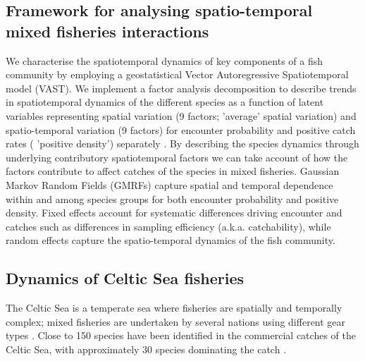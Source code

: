 \documentclass{nature}
\begin{document}
\begin{linenumbers}
\subsection{Framework for analysing spatio-temporal mixed fisheries
	interactions}

 We  characterise
the spatiotemporal dynamics of key components of a fish community by employing
a geostatistical Vector Autoregressive Spatiotemporal model (VAST). We
implement a factor analysis decomposition to describe trends in spatiotemporal
dynamics of the different species as a function of latent variables
\cite{Thorson2015} representing spatial variation (9 factors;  'average' spatial variation) and spatio-temporal variation (9
factors) for encounter probability and positive catch rates ( 'positive density') separately \cite{Thorson2015a}. By
describing the species dynamics through underlying contributory
spatiotemporal factors we can take account of how the factors contribute to
affect catches of the species in mixed fisheries.  Gaussian
Markov Random Fields (GMRFs)  capture spatial and temporal dependence
within and among species groups for both encounter probability and positive
density\cite{Thorson2013}.  Fixed effects  account for systematic differences driving
encounter and catches\deleted{,} such as differences in sampling efficiency (a.k.a.
catchability), while random effects capture the spatio-temporal dynamics of the
fish community.

\subsection{Dynamics of Celtic Sea fisheries}

The Celtic Sea is a temperate sea where fisheries are spatially and temporally
complex; mixed fisheries are undertaken by several nations using different gear
types \cite{Ellis2000, Gerritsen2012}. Close to 150 species have been
identified in the commercial catches of the Celtic Sea, with approximately 30
species dominating the catch \cite{Mateo2016}.


\end{linenumbers}
\end{document}
